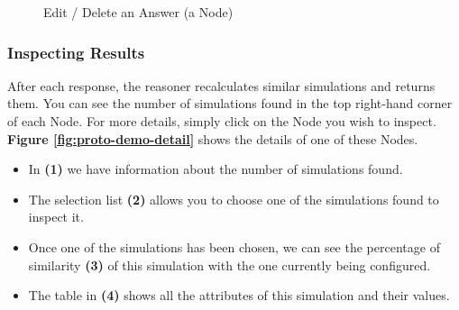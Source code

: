     \begin{figure}[h]
    \centering
    \caption{\label{fig:proto-demo-edit-delete-answer}  Edit / Delete an Answer (a Node)}
    \end{figure}

    
    \subsubsection{Inspecting Results}
    After each response, the reasoner recalculates similar simulations and returns them. You can see the number of simulations found in the top right-hand corner of each Node. For more details, simply click on the Node you wish to inspect. \textbf{Figure \ref{fig:proto-demo-detail}} shows the details of one of these Nodes.
    
    \begin{itemize}
        \item In \textbf{(1)} we have information about the number of simulations found.
        \item The selection list \textbf{(2)} allows you to choose one of the simulations found to inspect it.
        \item Once one of the simulations has been chosen, we can see the percentage of similarity \textbf{(3)} of this simulation with the one currently being configured.
        \item The table in \textbf{(4)} shows all the attributes of this simulation and their values.\\
    \end{itemize}
    
